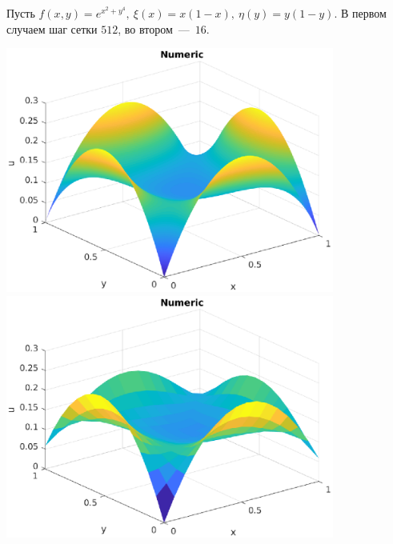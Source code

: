 \documentclass[12pt, a4paper]{article} %
\begin{document}
Пусть $f(x, y) = e^{x^2 + y^4},\ \xi(x) = x(1 - x),\ \eta(y) = y(1-y)$.
В первом случаем шаг сетки $512$, во втором~---~$16$.
\begin{center}
\includegraphics[width=0.81\textwidth]{3_1.eps}\\
\includegraphics[width=0.81\textwidth]{3_2.eps}
\end{center}

\newpage 
\end{document}
